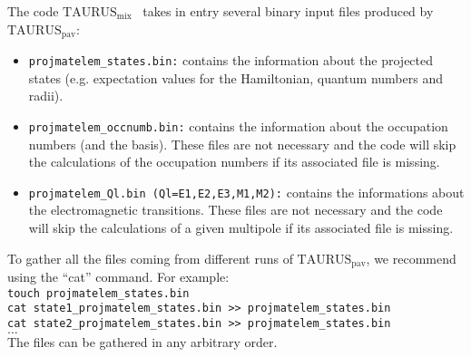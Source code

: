\documentclass[a4paper,11pt]{article}
\newcommand{\TAURUSpav}{$\text{TAURUS}_{\text{pav}}$}
\newcommand{\TAURUSmix}{$\text{TAURUS}_{\text{mix}}$}
\newcommand{\ttt}[1]{\texttt{#1}}
\begin{document}
The code \TAURUSmix~ takes in entry several binary input files produced by \TAURUSpav: 
\begin{itemize}
  \item \ttt{projmatelem\_states.bin:} contains the information about the projected states (e.g. expectation values for the Hamiltonian, quantum numbers and radii).
  \item \ttt{projmatelem\_occnumb.bin:} contains the information about the occupation numbers (and the basis). These files are not necessary and the code will 
        skip the calculations of the occupation numbers if its associated file is missing. 
  \item \ttt{projmatelem\_Ql.bin (Ql=E1,E2,E3,M1,M2):} contains the informations about the electromagnetic transitions. These files are not necessary and the code will 
        skip the calculations of a given multipole if its associated file is missing. 
\end{itemize}
To gather all the files coming from different runs of \TAURUSpav, we recommend using the ``cat'' command. For example: \\
{\tt touch projmatelem\_states.bin} \\
{\tt cat state1\_projmatelem\_states.bin >> projmatelem\_states.bin} \\
{\tt cat state2\_projmatelem\_states.bin >> projmatelem\_states.bin} \\
{\tt $\ldots$} \\
The files can be gathered in any arbitrary order.

%
%
\end{document}

